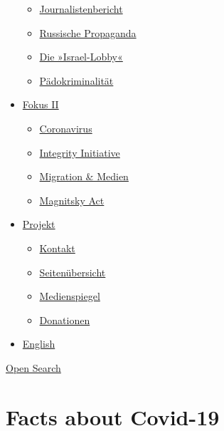 \begin{itemize}
  \begin{itemize}
  \tightlist
  \item
    \href{https://swprs.org/bericht-eines-journalisten/}{Journalistenbericht}
  \item
    \href{https://swprs.org/russische-propaganda/}{Russische Propaganda}
  \item
    \href{https://swprs.org/die-israel-lobby-fakten-und-mythen/}{Die
    »Israel-Lobby«}
  \item
    \href{https://swprs.org/geopolitik-und-paedokriminalitaet/}{Pädokriminalität}
  \end{itemize}
\item
  \href{https://swprs.org/migration-und-medien/}{Fokus II}

  \begin{itemize}
  \tightlist
  \item
    \href{https://swprs.org/covid-19-hinweis-ii/}{Coronavirus}
  \item
    \href{https://swprs.org/die-integrity-initiative/}{Integrity
    Initiative}
  \item
    \href{https://swprs.org/migration-und-medien/}{Migration \& Medien}
  \item
    \href{https://swprs.org/der-fall-magnitsky/}{Magnitsky Act}
  \end{itemize}
\item
  \href{https://swprs.org/kontakt/}{Projekt}

  \begin{itemize}
  \tightlist
  \item
    \href{https://swprs.org/kontakt/}{Kontakt}
  \item
    \href{https://swprs.org/uebersicht/}{Seitenübersicht}
  \item
    \href{https://swprs.org/medienspiegel/}{Medienspiegel}
  \item
    \href{https://swprs.org/donationen/}{Donationen}
  \end{itemize}
\item
  \href{https://swprs.org/contact/}{English}
\end{itemize}

\protect\hyperlink{}{Open Search}

\hypertarget{facts-about-covid-19}{%
\section{Facts about Covid-19}\label{facts-about-covid-19}}

